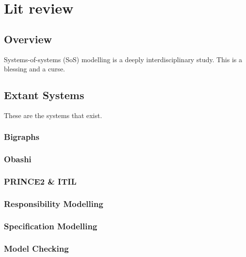 \chapter{Lit review}

\section{Overview}

Systems-of-systems (SoS) modelling is a deeply interdisciplinary study. This is a blessing and a curse.
\par


\section{Extant Systems}
These are the systems that exist.


\subsection{Bigraphs}


\subsection{Obashi}



\subsection{PRINCE2 \& ITIL}



\subsection{Responsibility Modelling}


\subsection{Specification Modelling}


\subsection{Model Checking}


